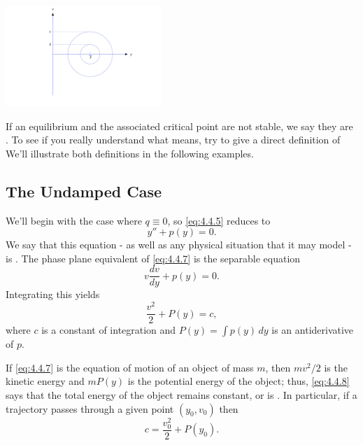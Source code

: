 \documentclass{ximera}
\begin{document}
\begin{image}
 \includegraphics[height=1.5in]{fig040401.jpg}
\end{image}
 
If an equilibrium and the associated critical point are not stable, we
say they are . To see if you really understand what
 means, try to give a direct definition of 
We'll illustrate both definitions in
the following examples.
 
 
\subsection*{The Undamped Case}
 
We'll begin with the case where $q\equiv0$, so  \eqref{eq:4.4.5}
reduces to
 \begin{equation} \label{eq:4.4.7}
y''+p(y)=0.
\end{equation}
We say that this equation - as well as any physical situation
that it may model - is .
The phase plane equivalent of \eqref{eq:4.4.7} is  the
separable equation
$$
v\frac{dv}{dy}+p(y)=0.
$$
 Integrating this  yields
\begin{equation} \label{eq:4.4.8}
\frac{v^2}{2}+P(y)=c,
\end{equation}
where $c$ is a constant of integration and $P(y)=\int p(y)\,dy$ is an
antiderivative of $p$.
 
If \eqref{eq:4.4.7} is the equation of motion of an object of
mass $m$, then
 $mv^2/2$ is the kinetic energy and $mP(y)$ is the
potential energy of the object;   thus, \eqref{eq:4.4.8} says that the
total
energy of the object remains constant, or is . In
particular, if a trajectory passes through a given point $(y_0,v_0)$
then
$$
c=\frac{v_0^2}{2}+P(y_0).
$$
 
 
 
\end{document}
